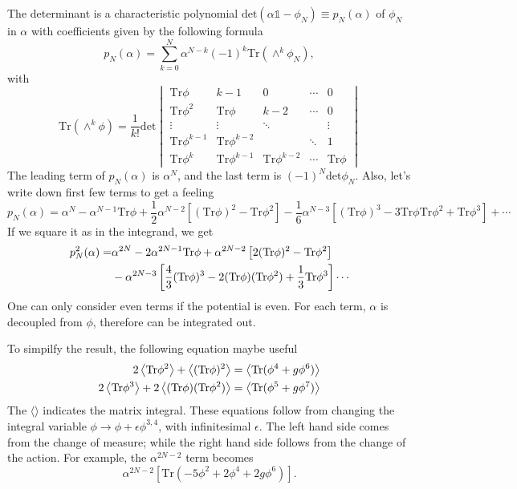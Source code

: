 The determinant is a characteristic polynomial $\mathrm{det}( \alpha\mathds{1} - \phi_N)\equiv p_N (\alpha)$ of $\phi_N$ in $\alpha$ with coefficients given by the following formula
\begin{equation}
    p_N (\alpha) = \sum_{k=0}^N \alpha^{N-k}(-1)^k \mathrm{Tr} \left(\wedge^k \phi_N \right),
\end{equation}
with
\[\mathrm{Tr} \left(\wedge^k \phi \right) = \frac{1}{k!}\mathrm{det}\begin{vmatrix}
\mathrm{Tr} \phi & k-1 & 0 & \cdots & 0\\ 
\mathrm{Tr} \phi^2 & \mathrm{Tr} \phi & k-2 & \cdots & 0 \\ 
\vdots & \vdots & \ddots  &  &\vdots \\ 
\mathrm{Tr} \phi^{k-1} & \mathrm{Tr} \phi^{k-2} &  & \ddots  & 1\\ 
\mathrm{Tr} \phi^k & \mathrm{Tr} \phi^{k-1} & \mathrm{Tr} \phi^{k-2} & \cdots & \mathrm{Tr} \phi
\end{vmatrix}\]
The leading term of $p_N(\alpha)$ is $\alpha^N$, and the last term is $(-1)^N \mathrm{det}\phi_N$. Also, let's write down first few terms to get a feeling
\[p_N(\alpha) = \alpha^N - \alpha^{N-1}\mathrm{Tr}\phi + \frac{1}{2}\alpha^{N-2}\left[(\mathrm{Tr} \phi)^2 - \mathrm{Tr} \phi^2\right] - \frac{1}{6}\alpha^{N-3}\left[(\mathrm{Tr}\phi)^3 - 3\mathrm{Tr}\phi \mathrm{Tr}\phi^2 + \mathrm{Tr}\phi^3\right] + \cdots\]
If we square it as in the integrand, we get
\begin{align}
	p_N^2(\alpha) =& \alpha^{2N} - 2 \alpha^{2N-1} \mathrm{Tr}\phi + \alpha^{2N-2}\left[2(\mathrm{Tr}\phi)^2 - \mathrm{Tr} \phi^2 \right] \notag\\
				   & -\alpha^{2N-3} \left[\frac{4}{3}(\mathrm{Tr}\phi)^3 -2 (\mathrm{Tr}\phi)(\mathrm{Tr}\phi^2) + \frac{1}{3}\mathrm{Tr}\phi^3\right] \cdots
\end{align}
One can only consider even terms if the potential is even.
For each term, $\alpha$ is decoupled from $\phi$, therefore can be integrated out.

To simpilfy the result, the following equation maybe useful
\begin{align}
	2\left\langle \mathrm{Tr}\phi^2 \right\rangle + \left\langle (\mathrm{Tr}\phi)^2 \right\rangle &= \left\langle \mathrm{Tr}(\phi^4 + g \phi^6) \right\rangle \notag\\
	2\left\langle \mathrm{Tr}\phi^3 \right\rangle + 2\left\langle (\mathrm{Tr}\phi)(\mathrm{Tr}\phi^2) \right\rangle &= \left\langle \mathrm{Tr}(\phi^5 + g \phi^7) \right\rangle
\end{align}
The $\langle \rangle$ indicates the matrix integral.
These equations follow from changing the integral variable $\phi \to \phi + \epsilon \phi^{3,4}$, with infinitesimal $\epsilon$.
The left hand side comes from the change of measure; while the right hand side follows from the change of the action.
For example, the $\alpha^{2N-2}$ term becomes
\[
	\alpha^{2N-2}\left[\mathrm{Tr}(-5\phi^2 + 2\phi^4 + 2g\phi^6)\right]
.\] 

